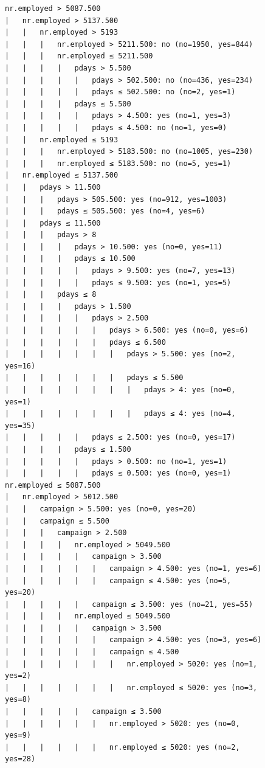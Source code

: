 \documentclass[prodmode]{acmsmall} %
\begin{document}
\begin{figure}[!t]
    \begin{verbatim}
nr.employed > 5087.500
|   nr.employed > 5137.500
|   |   nr.employed > 5193
|   |   |   nr.employed > 5211.500: no (no=1950, yes=844)
|   |   |   nr.employed ≤ 5211.500
|   |   |   |   pdays > 5.500
|   |   |   |   |   pdays > 502.500: no (no=436, yes=234)
|   |   |   |   |   pdays ≤ 502.500: no (no=2, yes=1)
|   |   |   |   pdays ≤ 5.500
|   |   |   |   |   pdays > 4.500: yes (no=1, yes=3)
|   |   |   |   |   pdays ≤ 4.500: no (no=1, yes=0)
|   |   nr.employed ≤ 5193
|   |   |   nr.employed > 5183.500: no (no=1005, yes=230)
|   |   |   nr.employed ≤ 5183.500: no (no=5, yes=1)
|   nr.employed ≤ 5137.500
|   |   pdays > 11.500
|   |   |   pdays > 505.500: yes (no=912, yes=1003)
|   |   |   pdays ≤ 505.500: yes (no=4, yes=6)
|   |   pdays ≤ 11.500
|   |   |   pdays > 8
|   |   |   |   pdays > 10.500: yes (no=0, yes=11)
|   |   |   |   pdays ≤ 10.500
|   |   |   |   |   pdays > 9.500: yes (no=7, yes=13)
|   |   |   |   |   pdays ≤ 9.500: yes (no=1, yes=5)
|   |   |   pdays ≤ 8
|   |   |   |   pdays > 1.500
|   |   |   |   |   pdays > 2.500
|   |   |   |   |   |   pdays > 6.500: yes (no=0, yes=6)
|   |   |   |   |   |   pdays ≤ 6.500
|   |   |   |   |   |   |   pdays > 5.500: yes (no=2, yes=16)
|   |   |   |   |   |   |   pdays ≤ 5.500
|   |   |   |   |   |   |   |   pdays > 4: yes (no=0, yes=1)
|   |   |   |   |   |   |   |   pdays ≤ 4: yes (no=4, yes=35)
|   |   |   |   |   pdays ≤ 2.500: yes (no=0, yes=17)
|   |   |   |   pdays ≤ 1.500
|   |   |   |   |   pdays > 0.500: no (no=1, yes=1)
|   |   |   |   |   pdays ≤ 0.500: yes (no=0, yes=1)
nr.employed ≤ 5087.500
|   nr.employed > 5012.500
|   |   campaign > 5.500: yes (no=0, yes=20)
|   |   campaign ≤ 5.500
|   |   |   campaign > 2.500
|   |   |   |   nr.employed > 5049.500
|   |   |   |   |   campaign > 3.500
|   |   |   |   |   |   campaign > 4.500: yes (no=1, yes=6)
|   |   |   |   |   |   campaign ≤ 4.500: yes (no=5, yes=20)
|   |   |   |   |   campaign ≤ 3.500: yes (no=21, yes=55)
|   |   |   |   nr.employed ≤ 5049.500
|   |   |   |   |   campaign > 3.500
|   |   |   |   |   |   campaign > 4.500: yes (no=3, yes=6)
|   |   |   |   |   |   campaign ≤ 4.500
|   |   |   |   |   |   |   nr.employed > 5020: yes (no=1, yes=2)
|   |   |   |   |   |   |   nr.employed ≤ 5020: yes (no=3, yes=8)
|   |   |   |   |   campaign ≤ 3.500
|   |   |   |   |   |   nr.employed > 5020: yes (no=0, yes=9)
|   |   |   |   |   |   nr.employed ≤ 5020: yes (no=2, yes=28)
\end{verbatim}
\end{figure}
\end{document}

